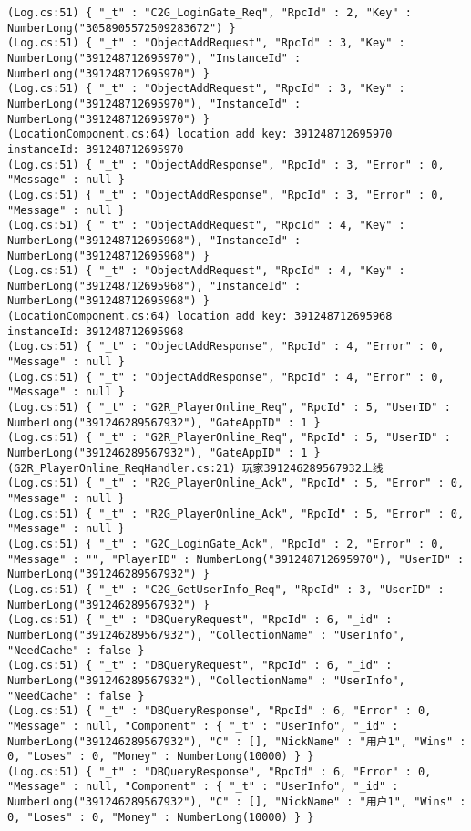 \documentclass[9pt, b5paper]{article}
\begin{document}
\begin{itemize}
\begin{verbatim}
(Log.cs:51) { "_t" : "C2G_LoginGate_Req", "RpcId" : 2, "Key" : NumberLong("3058905572509283672") }
(Log.cs:51) { "_t" : "ObjectAddRequest", "RpcId" : 3, "Key" : NumberLong("391248712695970"), "InstanceId" : NumberLong("391248712695970") }
(Log.cs:51) { "_t" : "ObjectAddRequest", "RpcId" : 3, "Key" : NumberLong("391248712695970"), "InstanceId" : NumberLong("391248712695970") }
(LocationComponent.cs:64) location add key: 391248712695970 instanceId: 391248712695970
(Log.cs:51) { "_t" : "ObjectAddResponse", "RpcId" : 3, "Error" : 0, "Message" : null }
(Log.cs:51) { "_t" : "ObjectAddResponse", "RpcId" : 3, "Error" : 0, "Message" : null }
(Log.cs:51) { "_t" : "ObjectAddRequest", "RpcId" : 4, "Key" : NumberLong("391248712695968"), "InstanceId" : NumberLong("391248712695968") }
(Log.cs:51) { "_t" : "ObjectAddRequest", "RpcId" : 4, "Key" : NumberLong("391248712695968"), "InstanceId" : NumberLong("391248712695968") }
(LocationComponent.cs:64) location add key: 391248712695968 instanceId: 391248712695968
(Log.cs:51) { "_t" : "ObjectAddResponse", "RpcId" : 4, "Error" : 0, "Message" : null }
(Log.cs:51) { "_t" : "ObjectAddResponse", "RpcId" : 4, "Error" : 0, "Message" : null }
(Log.cs:51) { "_t" : "G2R_PlayerOnline_Req", "RpcId" : 5, "UserID" : NumberLong("391246289567932"), "GateAppID" : 1 }
(Log.cs:51) { "_t" : "G2R_PlayerOnline_Req", "RpcId" : 5, "UserID" : NumberLong("391246289567932"), "GateAppID" : 1 }
(G2R_PlayerOnline_ReqHandler.cs:21) 玩家391246289567932上线
(Log.cs:51) { "_t" : "R2G_PlayerOnline_Ack", "RpcId" : 5, "Error" : 0, "Message" : null }
(Log.cs:51) { "_t" : "R2G_PlayerOnline_Ack", "RpcId" : 5, "Error" : 0, "Message" : null }
(Log.cs:51) { "_t" : "G2C_LoginGate_Ack", "RpcId" : 2, "Error" : 0, "Message" : "", "PlayerID" : NumberLong("391248712695970"), "UserID" : NumberLong("391246289567932") }
(Log.cs:51) { "_t" : "C2G_GetUserInfo_Req", "RpcId" : 3, "UserID" : NumberLong("391246289567932") }
(Log.cs:51) { "_t" : "DBQueryRequest", "RpcId" : 6, "_id" : NumberLong("391246289567932"), "CollectionName" : "UserInfo", "NeedCache" : false }
(Log.cs:51) { "_t" : "DBQueryRequest", "RpcId" : 6, "_id" : NumberLong("391246289567932"), "CollectionName" : "UserInfo", "NeedCache" : false }
(Log.cs:51) { "_t" : "DBQueryResponse", "RpcId" : 6, "Error" : 0, "Message" : null, "Component" : { "_t" : "UserInfo", "_id" : NumberLong("391246289567932"), "C" : [], "NickName" : "用户1", "Wins" : 0, "Loses" : 0, "Money" : NumberLong(10000) } }
(Log.cs:51) { "_t" : "DBQueryResponse", "RpcId" : 6, "Error" : 0, "Message" : null, "Component" : { "_t" : "UserInfo", "_id" : NumberLong("391246289567932"), "C" : [], "NickName" : "用户1", "Wins" : 0, "Loses" : 0, "Money" : NumberLong(10000) } }

\end{verbatim}
\end{itemize}
\end{document}
